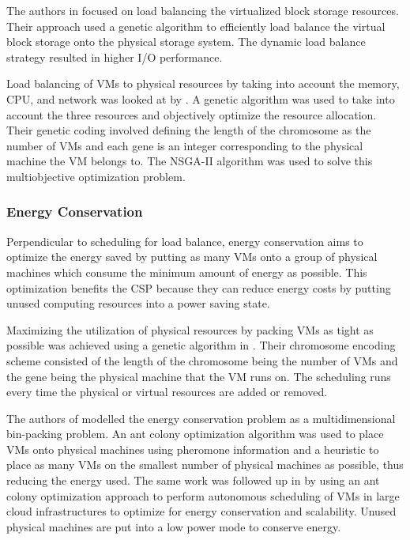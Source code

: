 \documentclass[12pt]{article}
\begin{document}
The authors in \cite{zhou2012optimize} focused on load balancing the virtualized block storage resources. Their approach used a genetic algorithm to efficiently load balance the virtual block storage onto the physical storage system. The dynamic load balance strategy resulted in higher I/O performance.

Load balancing of VMs to physical resources by taking into account the memory, CPU, and network was looked at by \cite{zhao2011multi}. A genetic algorithm was used to take into account the three resources and objectively optimize the resource allocation. Their genetic coding involved defining the length of the chromosome as the number of VMs and each gene is an integer corresponding to the physical machine the VM belongs to. The NSGA-II algorithm was used to solve this multiobjective optimization problem.



\subsubsection{Energy Conservation}

Perpendicular to scheduling for load balance, energy conservation aims to optimize the energy saved by putting as many VMs onto a group of physical machines which consume the minimum amount of energy as possible. This optimization benefits the CSP because they can reduce energy costs by putting unused computing resources into a power saving state.

Maximizing the utilization of physical resources by packing VMs as tight as possible was achieved using a genetic algorithm in \cite{zhong2010approach}. Their chromosome encoding scheme consisted of the length of the chromosome being the number of VMs and the gene being the physical machine that the VM runs on. The scheduling runs every time the physical or virtual resources are added or removed.

The authors of \cite{feller2011energy} modelled the energy conservation problem as a multidimensional bin-packing problem. An ant colony optimization algorithm was used to place VMs onto physical machines using pheromone information and a heuristic to place as many VMs on the smallest number of physical machines as possible, thus reducing the energy used. The same work was followed up in \cite{feller2012autonomous} by using an ant colony optimization approach to perform autonomous scheduling of VMs in large cloud infrastructures to optimize for energy conservation and scalability. Unused physical machines are put into a low power mode to conserve energy.
\end{document}
